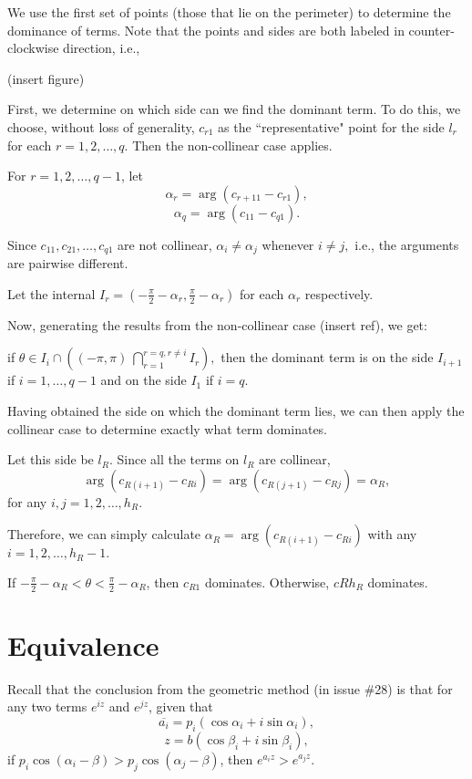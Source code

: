 \documentclass[11pt,reqno,oneside,a4paper]{article}
\begin{document}
\par We use the first set of points (those that lie on the perimeter) to determine the dominance of terms. Note that the points and sides are both labeled in counter-clockwise direction, i.e.,

(insert figure)

\par First, we determine on which side can we find the dominant term. To do this, we choose, without loss of generality, $c_{r 1}$ as the ``representative" point for the side $l_r$ for each $r=1,2,\dots,q$. Then the non-collinear case applies. 

\par For $r = 1,2,\dots,q-1$, let 
$$\alpha_r = \arg(c_{r+1 1} - c_{r 1}),$$
$$\alpha_q = \arg(c_{1 1} - c_{q 1}).$$

Since $c_{1 1}, c_{2 1}, \dots, c_{q 1}$ are not collinear, $\alpha_i \neq \alpha_j$ whenever $i\neq j,$ i.e., the arguments are pairwise different.  

Let the internal $I_r = \left(-\frac{\pi}{2} - \alpha_r, \frac{\pi}{2} - \alpha_r\right)$ for each $\alpha_r$ respectively. 

Now, generating the results from the non-collinear case (insert ref), we get:

if $\theta\in I_i \cap \left((-\pi, \pi) \ \bigcap_{r=1}^{r=q,r\neq i} I_r\right),$ then the dominant term is on the side  $I_{i+1}$ if $i = 1,\dots,q-1$ and on the side $I_1$ if $i = q$.

Having obtained the side on which the dominant term lies, we can then apply the collinear case to determine exactly what term dominates. 

Let this side be $l_R$. Since all the terms on $l_R$ are collinear, 
$$\arg(c_{R (i+1)} - c_{R i}) = \arg(c_{R (j+1)} - c_{R j}) = \alpha_R,$$
for any $i,j = 1,2,\dots, h_R$. 

Therefore, we can simply calculate $\alpha_R = \arg(c_{R (i+1)} - c_{R i})$ with any $i = 1,2,\dots, h_R - 1.$

If $-\frac{\pi}{2} -\alpha_R < \theta < \frac{\pi}{2} - \alpha_R$, then $c_{R 1}$ dominates. Otherwise, $c{R h_R}$ dominates. 

\section{Equivalence}\label{sec:eq}
Recall that the conclusion from the geometric method (in issue \#28) is that for any two terms $e^{iz}$ and $e^{jz}$, given that 
$$\overline{a_i} = p_i (\cos\alpha_i + i\sin\alpha_i),$$
$$z = b (\cos\beta_i + i\sin\beta_i),$$
if $p_i\cos(\alpha_i -\beta) > p_j\cos(\alpha_j -\beta)$, then $e^{a_iz}>e^{a_jz}$. 
\end{document}
